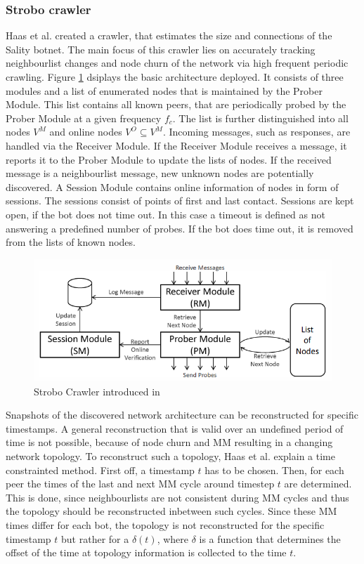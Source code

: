 \documentclass{article}
\begin{document}
\subsubsection{Strobo crawler} \label{subsec:StroboCrawler}
Haas et al. \cite{haas2016resilience} created a crawler, that estimates the size and connections of the Sality botnet. The main focus of this crawler lies on accurately tracking neighbourlist changes and node churn of the network via high frequent periodic crawling. Figure \ref{fig:StroboCrawler} dsiplays the basic architecture deployed. It consists of three modules and a list of enumerated nodes that is maintained by the Prober Module.  This list contains all known peers, that are periodically probed by the Prober Module at a given frequency $f_{c}$. The list is further distinguished into all nodes $V^{M}$ and online nodes $V^{O} \subseteq V^{M}$. Incoming messages, such as responses, are handled via the Receiver Module. If the Receiver Module receives a message, it reports it to the Prober Module to update the lists of nodes. If the received message is a neighbourlist message, new unknown nodes are potentially discovered. A Session Module contains online information of nodes in form of sessions. The sessions consist of points of first and last contact. Sessions are kept open, if the bot does not time out. In this case a timeout is defined as not answering a predefined number of probes. If the bot does time out, it is removed from the lists of known nodes.

\begin{figure}[H]
    \centering
    \includegraphics[width=\textwidth]{StroboCrawler.png}
    \caption{Strobo Crawler introduced in \cite{haas2016resilience}}
    \label{fig:StroboCrawler}
\end{figure}

Snapshots of the discovered network architecture can be reconstructed for specific timestamps. A general reconstruction that is valid over an undefined period of time is not possible, because of node churn and MM resulting in a changing network topology. To reconstruct such a topology, Haas et al. \cite{haas2016resilience} explain a time constrainted method. First off, a timestamp $t$ has to be chosen. Then, for each peer the times of the last and next MM cycle around timestep $t$ are determined. This is done, since neighbourlists are not consistent during MM cycles and thus the topology should be reconstructed inbetween such cycles. Since these MM times differ for each bot, the topology is not reconstructed for the specific timestamp $t$ but rather for a $\delta(t)$, where $\delta$ is a function that determines the offset of the time at topology information is collected to the time $t$. \\
\end{document}
